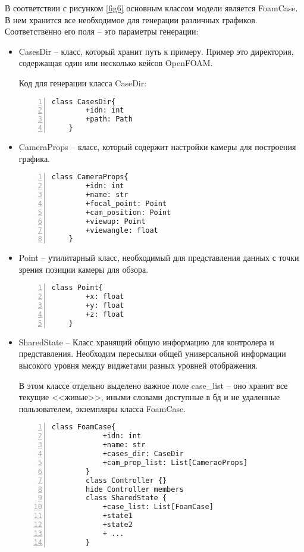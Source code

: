\documentclass[14pt]{extreport}
\begin{document}
В соответствии с рисунком \ref{fig6} основным классом модели является FoamCase. В нем хранится все необходимое для генерации различных графиков. Соответственно его поля -- это параметры генерации:
\begin{itemize}
	\item CasesDir -- класс, который хранит путь к примеру. Пример это директория, содержащая один или несколько кейсов OpenFOAM.
	
	Код для генерации класса CaseDir:	
	\begin{Verbatim}[numbers=left,xleftmargin=5mm,fontsize=\small]
	class CasesDir{
		+idn: int
		+path: Path
	}
	\end{Verbatim}
	
	\item CameraProps -- класс, который содержит настройки камеры для построения графика.
	
	\begin{Verbatim}[numbers=left,xleftmargin=5mm,fontsize=\small]
	class CameraProps{
		+idn: int
		+name: str
		+focal_point: Point
		+cam_position: Point
		+viewup: Point
		+viewangle: float
	}
	\end{Verbatim}
	\item Point -- утилитарный класс, необходимый для представления данных с точки зрения позиции камеры для обзора.
	
	\begin{Verbatim}[numbers=left,xleftmargin=5mm,fontsize=\small]
	class Point{
		+x: float
		+y: float
		+z: float
	}
	\end{Verbatim}
	\item SharedState -- Класс хранящий общую информацию для контролера и представления. Необходим пересылки общей универсальной информации высокого уровня между виджетами разных уровней отображения.
	
	В этом классе отдельно выделено важное поле case\_list -- оно хранит все текущие <<живые>>, иными словами доступные в бд и не удаленные пользователем, экземпляры класса FoamCase.
		\begin{Verbatim}[numbers=left,xleftmargin=5mm,fontsize=\small]
		class FoamCase{
			+idn: int
			+name: str
			+cases_dir: CaseDir
			+cam_prop_list: List[CameraoProps]
		}
		class Controller {}
		hide Controller members
		class SharedState {
			+case_list: List[FoamCase]
			+state1
			+state2
			+ ...
		}		
		\end{Verbatim}
	
\end{itemize}
\end{document}
